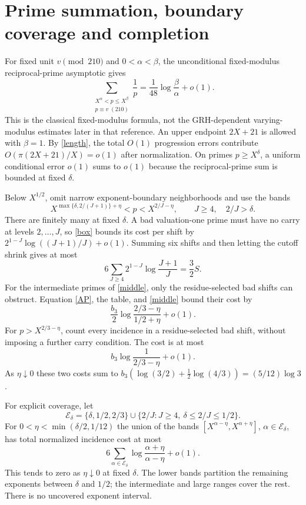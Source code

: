 \documentclass[11pt]{article}
\begin{document}
\section{Prime summation, boundary coverage and completion}
For fixed unit $v\pmod{210}$ and $0<\alpha<\beta$, the unconditional
fixed-modulus reciprocal-prime asymptotic\cite[eq.~(6)]{keliher} gives
\begin{equation}\label{AP}
 \sum_{\substack{X^\alpha<p\le X^\beta\\p\equiv v\; (210)}}\frac1p
 =\frac1{48}\log\frac\beta\alpha+o(1).
\end{equation}
This is the classical fixed-modulus formula, not the GRH-dependent varying-modulus
estimates later in that reference. An upper endpoint $2X+21$ is allowed with
$\beta=1$. By \eqref{length}, the total $O(1)$ progression errors contribute
$O(\pi(2X+21)/X)=o(1)$ after normalization. On primes $p\ge X^\delta$,
a uniform conditional error $o(1)$ sums to $o(1)$ because the reciprocal-prime
sum is bounded at fixed $\delta$.

Below $X^{1/2}$, omit narrow exponent-boundary neighborhoods and use the bands
\[
 X^{\max\{\delta,2/(J+1)\}+\eta}<p<X^{2/J-\eta},\qquad
 J\ge4,\quad 2/J>\delta.
\]
There are finitely many at fixed $\delta$. A bad valuation-one prime must have
no carry at levels $2,\ldots,J$, so \eqref{box} bounds its cost per shift by
$2^{1-J}\log((J+1)/J)+o(1)$. Summing six shifts and then letting the cutoff
shrink gives at most
\[
 6\sum_{J\ge4}2^{1-J}\log\frac{J+1}{J}=\frac32 S.
\]
For the intermediate primes of \eqref{middle}, only the residue-selected bad
shifts can obstruct. Equation \eqref{AP}, the table, and \eqref{middle} bound
their cost by
\[
 \frac{b_3}{2}\log\frac{2/3-\eta}{1/2+\eta}+o(1).
\]
For $p>X^{2/3-\eta}$, count every incidence in a residue-selected bad shift,
without imposing a further carry condition. The cost is at most
\[
 b_3\log\frac1{2/3-\eta}+o(1).
\]
As $\eta\downarrow0$ these two costs sum to
$b_3(\log(3/2)+\tfrac12\log(4/3))=(5/12)\log3$.

For explicit coverage, let
\[
 \mathcal E_\delta=\{\delta,1/2,2/3\}\cup
 \{2/J:J\ge4,\ \delta\le2/J\le1/2\}.
\]
For $0<\eta<\min(\delta/2,1/12)$ the union of the bands
$[X^{\alpha-\eta},X^{\alpha+\eta}]$, $\alpha\in\mathcal E_\delta$, has total
normalized incidence cost at most
\[
 6\sum_{\alpha\in\mathcal E_\delta}
 \log\frac{\alpha+\eta}{\alpha-\eta}+o(1).
\]
This tends to zero as $\eta\downarrow0$ at fixed $\delta$. The lower bands
partition the remaining exponents between $\delta$ and $1/2$; the intermediate
and large ranges cover the rest. There is no uncovered exponent interval.
\end{document}
